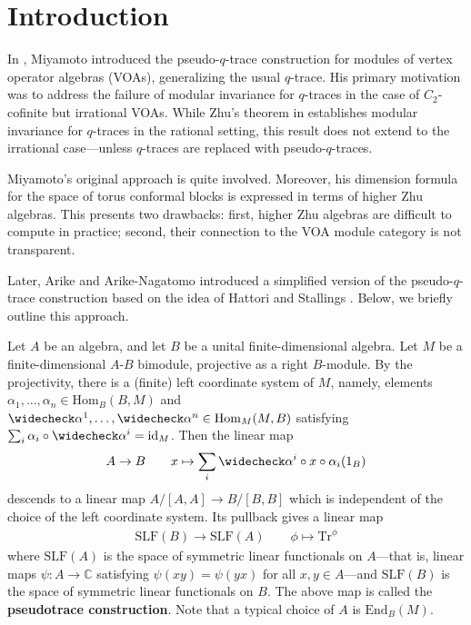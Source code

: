 \documentclass[11pt,b5paper,notitlepage]{article}
\theoremstyle{definition}
\theoremstyle{plain}
\newcommand{\wch}{\widecheck}
\newcommand{\Tr}{\mathrm{Tr}}
\newcommand{\End}{\mathrm{End}} %
\newcommand{\id}{\mathrm{id}}
\newcommand{\Hom}{\mathrm{Hom}}
\newcommand{\Cbb}{\mathbb C}
\newcommand{\SLF}{\mathrm{SLF}}
\numberwithin{equation}{section}
\begin{document}
\tableofcontents



\section{Introduction}


In \cite{Miy-modular-invariance}, Miyamoto introduced the pseudo-$q$-trace construction for modules of vertex operator algebras (VOAs), generalizing the usual $q$-trace. His primary motivation was to address the failure of modular invariance for $q$-traces in the case of $C_2$-cofinite but irrational VOAs. While Zhu's theorem in \cite{Zhu-modular-invariance} establishes modular invariance for $q$-traces in the rational setting, this result does not extend to the irrational case---unless $q$-traces are replaced with pseudo-$q$-traces.

Miyamoto's original approach is quite involved. Moreover, his dimension formula for the space of torus conformal blocks is expressed in terms of higher Zhu algebras. This presents two drawbacks: first, higher Zhu algebras are difficult to compute in practice; second, their connection to the VOA module category is not transparent.

Later, Arike \cite{Ari10} and Arike-Nagatomo \cite{AN-pseudo-trace} introduced a simplified version of the pseudo-$q$-trace construction based on the idea of Hattori \cite{Hattori65} and Stallings \cite{Stallings}. Below, we briefly outline this approach.

Let $A$ be an algebra, and let $B$ be a unital finite-dimensional algebra. Let $M$ be a finite-dimensional $A$-$B$ bimodule, projective as a right $B$-module. By the projectivity, there is a (finite) left coordinate system of $M$, namely, elements $\alpha_1,\dots,\alpha_n\in\Hom_B(B,M)$ and $\wch\alpha^1,\dots,\wch\alpha^n\in\Hom_M(M,B)$ satisfying $\sum_i\alpha_i\circ\wch\alpha^i=\id_M$. Then the linear map 
\begin{gather*}
A\rightarrow B\qquad x\mapsto\sum_i \wch\alpha^i\circ x\circ\alpha_i(1_B)
\end{gather*}
descends to a linear map $A/[A,A]\rightarrow B/[B,B]$ which is independent of the choice of the left coordinate system. Its pullback gives a linear map
\begin{align}\label{eq18}
\SLF(B)\rightarrow\SLF(A)\qquad \phi\mapsto\Tr^\phi
\end{align}
where $\SLF(A)$ is the space of symmetric linear functionals on $A$---that is, linear maps $\psi:A\rightarrow\Cbb$ satisfying $\psi(xy)=\psi(yx)$ for all $x,y\in A$---and $\SLF(B)$ is the space of symmetric linear functionals on $B$. The above map is called the \textbf{pseudotrace construction}. Note that a typical choice of $A$ is $\End_B(M)$.
\end{document}
